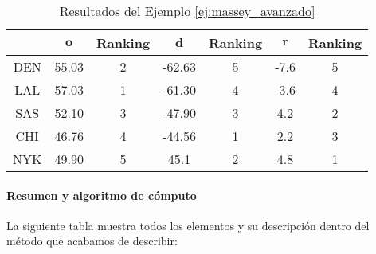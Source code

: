 \begin{ejemplo}
\begin{table}[h]
\centering
\caption{Resultados del Ejemplo \ref{ej:massey_avanzado}}
\label{tbl:massey_avanzado_resultados}
\begin{tabular}{@{}ccccccc@{}}
\cmidrule(l){2-7}
    & $\mathbf{o}$ & Ranking & $\mathbf{d}$ & Ranking & $\mathbf{r}$ & Ranking \\ \midrule
DEN & 55.03        & 2       & -62.63       & 5       & -7.6         & 5       \\
LAL & 57.03        & 1       & -61.30       & 4       & -3.6         & 4       \\
SAS & 52.10        & 3       & -47.90       & 3       & 4.2          & 2       \\
CHI & 46.76        & 4       & -44.56       & 1       & 2.2          & 3       \\
NYK & 49.90        & 5       & 45.1         & 2       & 4.8          & 1       \\ \bottomrule
\end{tabular}
\end{table}


\end{ejemplo}

\paragraph*{Resumen y algoritmo de cómputo}

La siguiente tabla muestra todos los elementos y su descripción dentro del método que acabamos de describir:

